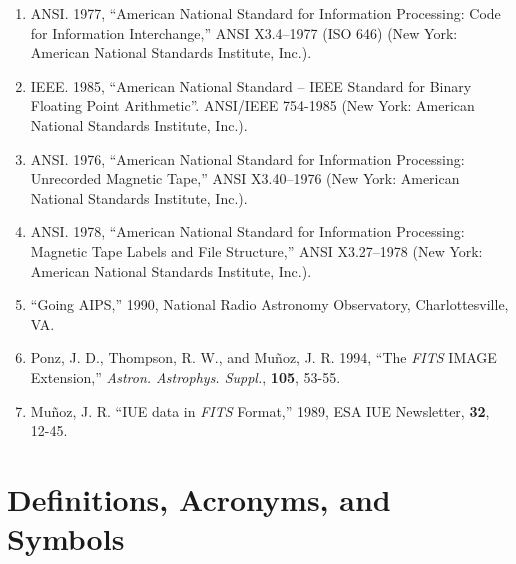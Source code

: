 \begin{enumerate}
\item ANSI. 1977, ``American National Standard for Information Processing:
        Code for Information Interchange,''
      ANSI X3.4--1977 (ISO 646) (New York: American National 
      Standards
      Institute, Inc.). 

\item  IEEE. 1985, ``American National Standard -- 
       IEEE Standard for Binary 
       Floating Point Arithmetic''. ANSI/IEEE 754-1985 
       (New York: American
        National Standards Institute, Inc.). 

\item ANSI. 1976, ``American National Standard for Information 
        Processing: Unre\-cor\-ded Magnetic Tape,''
        ANSI X3.40--1976 (New York: American 
        National Standards Institute, Inc.).

\item ANSI. 1978, ``American National Standard for 
      Information Processing: Magnetic Tape Labels and File Structure,''
      ANSI X3.27--1978 (New York: American 
        National Standards Institute, Inc.).
 
\item ``Going AIPS,'' 1990, National Radio Astronomy Observatory, 
      Charlottesville, VA.

\item Ponz, J. D., Thompson, R. W., and Mu\~{n}oz, J. R. 1994,
   ``The {\em FITS\/} IMAGE Extension,'' 
   {\em Astron. Astrophys. Suppl.}, {\bf 105}, 53-55.
  
\item Mu\~{n}oz, J. R. ``IUE data in 
    {\em FITS\/} Format,'' 1989, ESA IUE Newsletter, {\bf 32}, 12-45.
   
\end{enumerate}
  
\chapter{Definitions, Acronyms, and Symbols}
\label{s:def}

